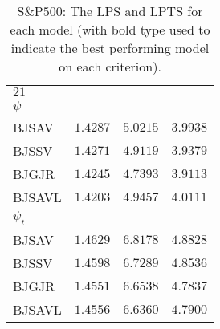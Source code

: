 \documentclass[12pt]{article}
\theoremstyle{plain}
\numberwithin{equation}{section}
\begin{document}
\begin{table}[h!]
\begin{center}
\begin{small}
\begin{tabular}{ l c c c }
{$21$} &{}&{}&{}\\
{$\psi$} \\
 {BJSAV}&     $1.4287$             &     $5.0215$             &     $3.9938$      \\
{BJSSV}&      $1.4271$             &     $4.9119$             &     $3.9379$      \\
{BJGJR}&      $1.4245$             &     $4.7393$             &     $3.9113$      \\
{BJSAVL}&    $1.4203$             &     $4.9457$             &     $4.0111$      \\
{$\psi_t$} \\
 {BJSAV}&     $1.4629$             &     $6.8178$             &     $4.8828$      \\
{BJSSV}&     $1.4598$             &     $6.7289$             &     $4.8536$      \\
{BJGJR}&     $1.4551$              &    $6.6538$             &     $4.7837$      \\
{BJSAVL}&   $1.4556$              &     $6.6360$             &     $4.7900$      \\\hline\hline
\end{tabular}
\end{small}
\caption{S\&P$500$: The LPS and LPTS for each model (with bold type used to indicate the best performing model on each criterion).}
\label{LPTS_SP500}
\end{center}
\end{table}
\end{document}

